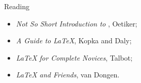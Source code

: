 \begin{frame}{Reading}

  \begin{itemize}
    \item \emph{Not So Short Introduction to \LaTeXe{}}, Oetiker;
    \item \emph{A Guide to \LaTeX{}}, Kopka and Daly;
    \item \emph{\LaTeX{} for Complete Novices}, Talbot;
    \item \emph{\LaTeX{} and Friends}, van Dongen.
  \end{itemize}

\end{frame}




